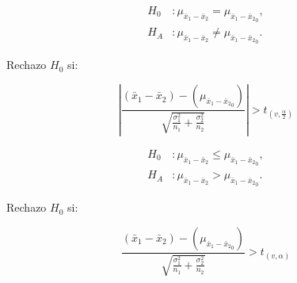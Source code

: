 
\begin{minipage}[c]{\textwidth}
    \begin{minipage}[c]{0.3 \textwidth}\item
    	\begin{align*}
    	H_0&: \mu _{ \bar { x } _{ 1 }-\bar { x } _{ 2 }} = \mu _{ \bar { x } _{ 1 }-\bar { x } _{ 2 }}_0,\\
    	H_A&: \mu _{ \bar { x } _{ 1 }-\bar { x } _{ 2 }} \neq \mu _{ \bar { x } _{ 1 }-\bar { x } _{ 2 }}_0.    	
    	\end{align*}\end{minipage} \hfill
    \begin{minipage}[b]{0.3 \textwidth}\item
				Rechazo	$H_0$ si:		
		\end{minipage} \hfill
    \begin{minipage}[c]{0.3 \textwidth}\item
	 $$\left|\frac {( \bar{x}_1-\bar{x}_2)-(\mu _{ \bar { x } _{ 1 }-\bar { x } _{ 2 }}_0 )}{\sqrt{\frac { \sigma^ 2_1 }{n_1} +\frac { \sigma^ 2_2 }{n_2}}  }\right|> t_{(v,\frac{\alpha}{2})}$$
    \end{minipage}
    \end{minipage}
    
    
	\begin{minipage}[c]{\textwidth}
    \begin{minipage}[c]{0.3 \textwidth}\item
    	\begin{align*}
    	H_0&: \mu _{ \bar { x } _{ 1 }-\bar { x } _{ 2 }} \le \mu _{ \bar { x } _{ 1 }-\bar { x } _{ 2 }}_0,\\
    	H_A&: \mu _{ \bar { x } _{ 1 }-\bar { x } _{ 2 }} > \mu _{ \bar { x } _{ 1 }-\bar { x } _{ 2 }}_0.    	
    	\end{align*}\end{minipage} \hfill
    \begin{minipage}[b]{0.3 \textwidth}\item
				Rechazo $H_0$ si:		
		\end{minipage} \hfill
    \begin{minipage}[c]{0.3 \textwidth}\item
	 $$\frac {( \bar{x}_1-\bar{x}_2)-(\mu _{ \bar { x } _{ 1 }-\bar { x } _{ 2 }}_0 )}{\sqrt{\frac { \sigma^ 2_1 }{n_1} +\frac { \sigma^ 2_2 }{n_2}}  }> t_{(v,\alpha)}$$
    \end{minipage}
    \end{minipage}
    
